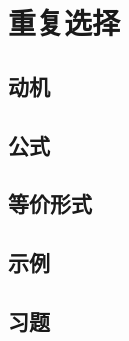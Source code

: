 \section{重复选择}

\subsection{动机}

\subsection{公式}

\subsection{等价形式}

\subsection{示例}

\subsection{习题}